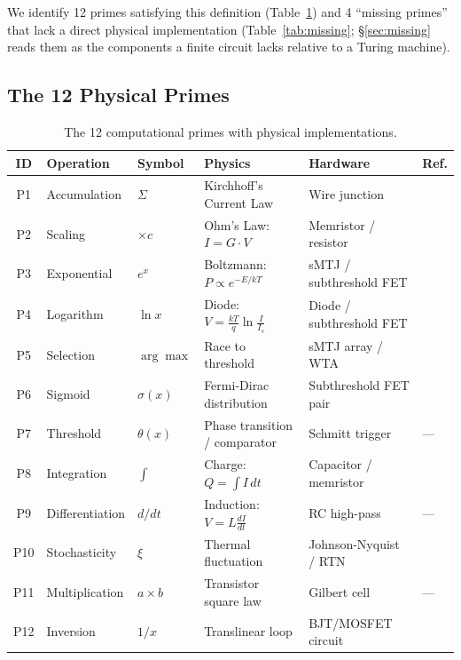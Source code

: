 \documentclass[11pt]{article}
\begin{document}
We identify 12 primes satisfying this definition (Table~\ref{tab:primes}) and 4 ``missing primes'' that lack a direct physical implementation (Table~\ref{tab:missing}; \S\ref{sec:missing} reads them as the components a finite circuit lacks relative to a Turing machine).

\subsection{The 12 Physical Primes}

\begin{table}[t]
\centering
\caption{The 12 computational primes with physical implementations.}
\label{tab:primes}
\footnotesize
\begin{tabular}{clllll}
\toprule
ID & Operation & Symbol & Physics & Hardware & Ref. \\
\midrule
P1 & Accumulation & $\Sigma$ & Kirchhoff's Current Law & Wire junction & \cite{prezioso2015} \\
P2 & Scaling & $\times c$ & Ohm's Law: $I = G \cdot V$ & Memristor / resistor & \cite{prezioso2015} \\
P3 & Exponential & $e^x$ & Boltzmann: $P \propto e^{-E/kT}$ & sMTJ / subthreshold FET & \cite{bieg2026sba,sillman2023} \\
P4 & Logarithm & $\ln x$ & Diode: $V = \frac{kT}{q}\ln\frac{I}{I_s}$ & Diode / subthreshold FET & \cite{tageldeen2025} \\
P5 & Selection & $\arg\max$ & Race to threshold & sMTJ array / WTA & \cite{bieg2026sba,bieg2026} \\
P6 & Sigmoid & $\sigma(x)$ & Fermi-Dirac distribution & Subthreshold FET pair & \cite{mram_sigmoid2022} \\
P7 & Threshold & $\theta(x)$ & Phase transition / comparator & Schmitt trigger & --- \\
P8 & Integration & $\int$ & Charge: $Q = \int I\,dt$ & Capacitor / memristor & \cite{denram2024} \\
P9 & Differentiation & $d/dt$ & Induction: $V = L\frac{dI}{dt}$ & RC high-pass & --- \\
P10 & Stochasticity & $\xi$ & Thermal fluctuation & Johnson-Nyquist / RTN & \cite{cryptoristor2024} \\
P11 & Multiplication & $a \times b$ & Transistor square law & Gilbert cell & --- \\
P12 & Inversion & $1/x$ & Translinear loop & BJT/MOSFET circuit & \cite{tageldeen2025} \\
\bottomrule
\end{tabular}
\end{table}
\end{document}
